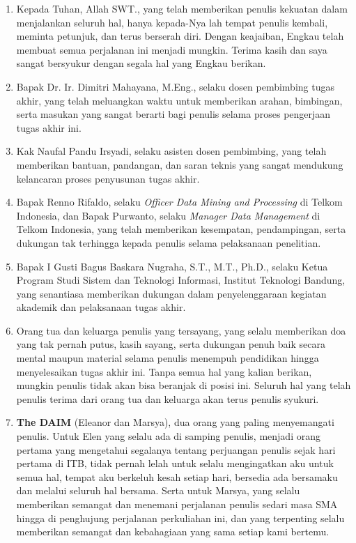 \begin{enumerate}
    \item Kepada Tuhan, Allah SWT., yang telah memberikan penulis kekuatan dalam menjalankan seluruh hal, hanya kepada-Nya lah tempat penulis kembali, meminta petunjuk, dan terus berserah diri. Dengan keajaiban, Engkau telah membuat semua perjalanan ini menjadi mungkin. Terima kasih dan saya sangat bersyukur dengan segala hal yang Engkau berikan.
    \item Bapak Dr. Ir. Dimitri Mahayana, M.Eng., selaku dosen pembimbing tugas akhir, yang telah meluangkan waktu untuk memberikan arahan, bimbingan, serta masukan yang sangat berarti bagi penulis selama proses pengerjaan tugas akhir ini.
    \item Kak Naufal Pandu Irsyadi, selaku asisten dosen pembimbing, yang telah memberikan bantuan, pandangan, dan saran teknis yang sangat mendukung kelancaran proses penyusunan tugas akhir.
    \item Bapak Renno Rifaldo, selaku \textit{Officer Data Mining and Processing} di Telkom Indonesia, dan Bapak Purwanto, selaku \textit{Manager Data Management} di Telkom Indonesia, yang telah memberikan kesempatan, pendampingan, serta dukungan tak terhingga kepada penulis selama pelaksanaan penelitian.
    \item Bapak I Gusti Bagus Baskara Nugraha, S.T., M.T., Ph.D., selaku Ketua Program Studi Sistem dan Teknologi Informasi, Institut Teknologi Bandung, yang senantiasa memberikan dukungan dalam penyelenggaraan kegiatan akademik dan pelaksanaan tugas akhir.
    \item Orang tua dan keluarga penulis yang tersayang, yang selalu memberikan doa yang tak pernah putus, kasih sayang, serta dukungan penuh baik secara mental maupun material selama penulis menempuh pendidikan hingga menyelesaikan tugas akhir ini. Tanpa semua hal yang kalian berikan, mungkin penulis tidak akan bisa beranjak di posisi ini. Seluruh hal yang telah penulis terima dari orang tua dan keluarga akan terus penulis syukuri.
    \item \textbf{The DAIM} (Eleanor dan Marsya), dua orang yang paling menyemangati penulis. Untuk Elen yang selalu ada di samping penulis, menjadi orang pertama yang mengetahui segalanya tentang perjuangan penulis sejak hari pertama di ITB, tidak pernah lelah untuk selalu mengingatkan aku untuk semua hal, tempat aku berkeluh kesah setiap hari, bersedia ada bersamaku dan melalui seluruh hal bersama. Serta untuk Marsya, yang selalu memberikan semangat dan menemani perjalanan penulis sedari masa SMA hingga di penghujung perjalanan perkuliahan ini, dan yang terpenting selalu memberikan semangat dan kebahagiaan yang sama setiap kami bertemu.

\end{enumerate}
